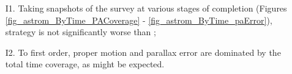 
\begin{itemize}
  \item[I1.] Taking snapshots of the survey at various stages of completion (Figures \ref{fig_astrom_ByTime_PACoverage} -  \ref{fig_astrom_ByTime_paError}), strategy  is not significantly worse than ;
\item[I2.] To first order, proper motion and parallax error are dominated by the total time coverage, as might be expected.
\end{itemize}

